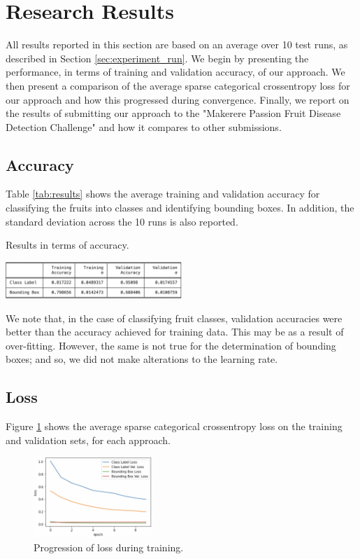 \section{Research Results}
All results reported in this section are based on an average over 10 test runs, as described in Section \ref{sec:experiment_run}. We begin by presenting the performance, in terms of training and validation accuracy, of our approach. We then present a comparison of the average sparse categorical crossentropy loss for our approach and how this progressed during convergence. Finally, we report on the results of submitting our approach to the "Makerere Passion Fruit Disease Detection Challenge" \cite{zindi} and how it compares to other submissions.

\subsection{Accuracy}

Table \ref{tab:results} shows the average training and validation accuracy for classifying the fruits into classes and identifying bounding boxes. In addition, the standard deviation across the 10 runs is also reported.

\begin{table}[htbp]
\caption{Results in terms of accuracy.}
\centerline{\includegraphics[width=0.5\textwidth]{report/5_results/results.png}}
\label{tab:results}
\end{table}

We note that, in the case of classifying fruit classes, validation accuracies were better than the accuracy achieved for training data. This may be as a result of over-fitting. However, the same is not true for the determination of bounding boxes; and so, we did not make alterations to the learning rate.

\subsection{Loss}
Figure \ref{fig:loss} shows the average sparse categorical crossentropy loss on the training and validation sets, for each approach.

\begin{figure}[htbp]
\centerline{\includegraphics[width=0.4\textwidth]{report/5_results/loss.png}}
\caption{Progression of loss during training.}
\label{fig:loss}
\end{figure}

